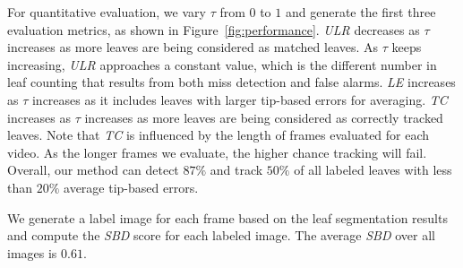 For quantitative evaluation, we vary $\tau$ from $0$ to $1$ and generate the first three evaluation metrics, as shown in Figure~\ref{fig:performance}.
{\it{ULR}} decreases as $\tau$ increases as more leaves are being considered as matched leaves.
As $\tau$ keeps increasing, {\it{ULR}} approaches a constant value, which is the different number in leaf counting that results from both miss detection and false alarms.
{\it{LE}} increases as $\tau$ increases as it includes leaves with larger tip-based errors for averaging.
{\it{TC}} increases as $\tau$ increases as more leaves are being considered as correctly tracked leaves.
Note that {\it{TC}} is influenced by the length of frames evaluated for each video.
As the longer frames we evaluate, the higher chance tracking will fail.
Overall, our method can detect $87\%$ and track $50\%$ of all labeled leaves with less than $20\%$ average tip-based errors.

We generate a label image for each frame based on the leaf segmentation results and compute the {\it{SBD}} score for each labeled image.
The average {\it{SBD}} over all images is $0.61$.









